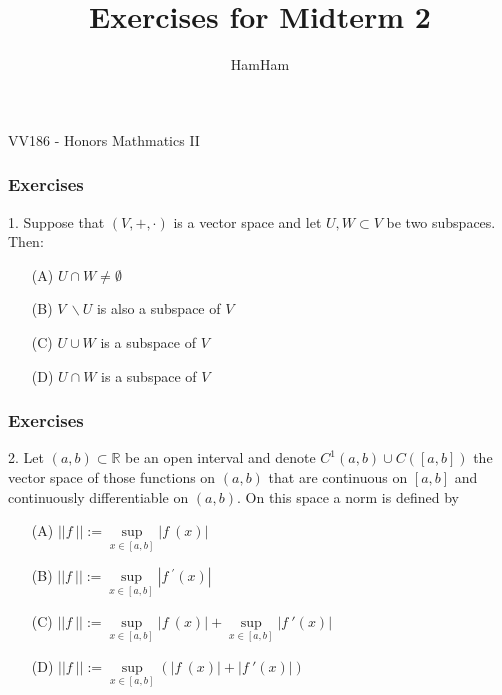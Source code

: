 \documentclass{beamer}
\title{\sffamily Exercises for Midterm 2}
\institute[UM-SJTU JI]{University of Michigan-Shanghai Jiao Tong University Joint Institute}
\author{HamHam}
\newcommand{\myfont}{\rmfamily\normalsize\upshape\mdseries}
\newcommand{\R}{\mathbb{R}}
\begin{document}
\begin{titlepage}
    \begin{center}
        VV186 - Honors Mathmatics II
    \end{center}
\end{titlepage}
\myfont

\begin{frame}
    \frametitle{Exercises}
    \hspace{1em}
    1. Suppose that $(V,+,\cdot)$ is a vector space and let $U,W\subset V$ be two 
    subspaces. Then:
    \vspace{1em}
    \begin{center}
        \begin{itemize}
            \item[(A)]$U\cap W \neq \emptyset$
            \item[(B)]$V~ \backslash U$ is also a subspace of $V$
            \item[(C)]$U\cup W$ is a subspace of $V$
            \item[(D)]$U\cap W$ is a subspace of $V$   
        \end{itemize}
    \end{center}
\end{frame}
\begin{frame}
    \frametitle{Exercises}

    \hspace{1em}
    2. Let $(a,b)\subset \R$ be an open interval and denote  $C^1(a,b)\cup C([a,b])$ the vector
    space of those functions on $(a,b)$ that are continuous on $[a,b]$ and 
    continuously differentiable on $(a,b)$. On this space a norm is defined by
    \vspace{1em}
    \begin{itemize}
            \item[(A)]$||f~||:=\underset{x\in [a,b]}{\sup} |f~(x)|$
            \item[(B)]$||f~||:=\underset{x\in [a,b]}{\sup} |f~^\prime(x)|$
            \item[(C)]$||f~||:=\underset{x\in [a,b]}{\sup} |f~(x)|+\underset{x\in [a,b]}{\sup} |f~'(x)|$
            \item[(D)]$||f~||:=\underset{x\in [a,b]}{\sup} (|f~(x)|+|f~'(x)|)$
    \end{itemize}
\end{frame}
\end{document}
